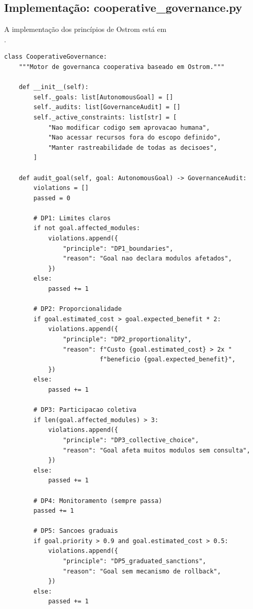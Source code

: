 \subsection{Implementação: cooperative\_governance.py}

A implementação dos princípios de Ostrom está em \\%
\hspace*{2em}.

\begin{lstlisting}[style=pythonstyle, caption={CooperativeGovernance: auditoria Ostrom (cooperative\_governance.py:129-273)}]
class CooperativeGovernance:
    """Motor de governanca cooperativa baseado em Ostrom."""

    def __init__(self):
        self._goals: list[AutonomousGoal] = []
        self._audits: list[GovernanceAudit] = []
        self._active_constraints: list[str] = [
            "Nao modificar codigo sem aprovacao humana",
            "Nao acessar recursos fora do escopo definido",
            "Manter rastreabilidade de todas as decisoes",
        ]

    def audit_goal(self, goal: AutonomousGoal) -> GovernanceAudit:
        violations = []
        passed = 0

        # DP1: Limites claros
        if not goal.affected_modules:
            violations.append({
                "principle": "DP1_boundaries",
                "reason": "Goal nao declara modulos afetados",
            })
        else:
            passed += 1

        # DP2: Proporcionalidade
        if goal.estimated_cost > goal.expected_benefit * 2:
            violations.append({
                "principle": "DP2_proportionality",
                "reason": f"Custo {goal.estimated_cost} > 2x "
                          f"beneficio {goal.expected_benefit}",
            })
        else:
            passed += 1

        # DP3: Participacao coletiva
        if len(goal.affected_modules) > 3:
            violations.append({
                "principle": "DP3_collective_choice",
                "reason": "Goal afeta muitos modulos sem consulta",
            })
        else:
            passed += 1

        # DP4: Monitoramento (sempre passa)
        passed += 1

        # DP5: Sancoes graduais
        if goal.priority > 0.9 and goal.estimated_cost > 0.5:
            violations.append({
                "principle": "DP5_graduated_sanctions",
                "reason": "Goal sem mecanismo de rollback",
            })
        else:
            passed += 1


\end{lstlisting}
